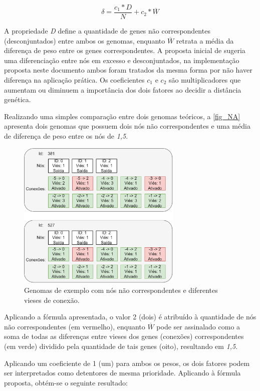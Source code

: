 \[ \delta = \frac{c_1 * D}{N} + c_2 * \overline{W}\]

A propriedade \textit{D} define a quantidade de genes não correspondentes
(desconjuntados) entre ambos os genomas, enquanto $\overline{W}$ retrata
a média da diferença de peso entre os genes correspondentes. A proposta inicial
de  sugeria uma diferenciação entre nós em excesso e
desconjuntados, na implementação proposta neste documento ambos foram tratados da
mesma forma por não haver diferença na aplicação prática. Os coeficientes $c_1$
e $c_2$ são multiplicadores que aumentam ou diminuem a importância dos dois fatores
ao decidir a distância genética.

Realizando uma simples comparação entre dois genomas teóricos, a \autoref{fig_NA} apresenta
dois genomas que possuem dois nós não correspondentes e uma média de diferença de peso entre os nós de \textit{1,5}.

\begin{figure}[htb]
        \centering
        \caption{\label{fig_NA}Genomas de exemplo com nós não correspondentes e diferentes vieses de conexão.}
        \includegraphics[width=0.7\textwidth]{images/NA.png}
\end{figure}

Aplicando a fórmula apresentada, o valor 2 (dois) é atribuído à quantidade
de nós não correspondentes (em vermelho), enquanto $\overline{W}$ pode ser
assinalado como a soma de todas as diferenças entre vieses dos genes (conexões)
correspondentes (em verde) dividido pela quantidade de tais genes (oito), resultando em \textit{1,5}.

Aplicando um coeficiente de 1 (um) para ambos os pesos, os dois fatores podem ser
interpretados como detentores de mesma prioridade. Aplicando à fórmula proposta, obtém-se o seguinte resultado:

